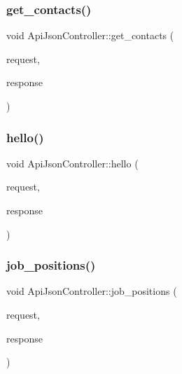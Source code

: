 \mbox{\label{classApiJsonController_a3a645ef96c3d0d3c8876c8b7b7d05ea6}} 
\subsubsection{\texorpdfstring{get\+\_\+contacts()}{get\_contacts()}}
{\footnotesize\ttfamily void Api\+Json\+Controller\+::get\+\_\+contacts (\begin{DoxyParamCaption}\item[{Mongoose\+::\+Request \&}]{request,  }\item[{Mongoose\+::\+Json\+Response \&}]{response }\end{DoxyParamCaption})}

\mbox{\label{classApiJsonController_adef3856c8f8f6cc7f4d980c31a9c31fb}} 
\subsubsection{\texorpdfstring{hello()}{hello()}}
{\footnotesize\ttfamily void Api\+Json\+Controller\+::hello (\begin{DoxyParamCaption}\item[{Mongoose\+::\+Request \&}]{request,  }\item[{Mongoose\+::\+Json\+Response \&}]{response }\end{DoxyParamCaption})}

\mbox{\label{classApiJsonController_ae31f4111016a43bf025c513ab7d7a6be}} 
\subsubsection{\texorpdfstring{job\+\_\+positions()}{job\_positions()}}
{\footnotesize\ttfamily void Api\+Json\+Controller\+::job\+\_\+positions (\begin{DoxyParamCaption}\item[{Mongoose\+::\+Request \&}]{request,  }\item[{Mongoose\+::\+Json\+Response \&}]{response }\end{DoxyParamCaption})}

